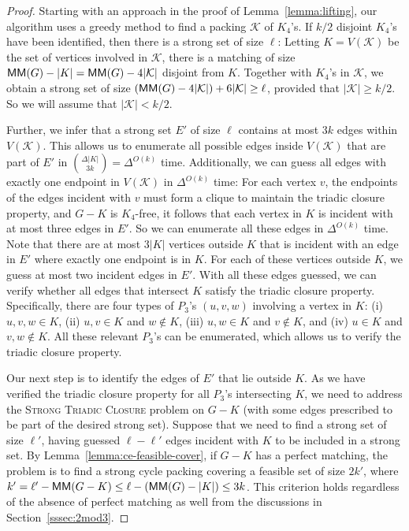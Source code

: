 \begin{proof}
  Starting with an approach in the proof of Lemma~\ref{lemma:lifting},
  our algorithm uses a greedy method to find a packing $\mathcal{K}$ of $K_4$'s.
  If $k/2$ disjoint $K_4$'s have been identified, then there is a strong set of size $\ell$: 
  Letting $K = V(\mathcal{K})$ be the set of vertices involved in $\mathcal{K}$,
  there is a matching of size $\mathsf{MM}(G) - |K| = \mathsf{MM}(G) - 4|\mathcal{K}|$ disjoint from $K$.
  Together with $K_4$'s in $\mathcal{K}$, we obtain a strong set of size $(\mathsf{MM}(G) - 4|\mathcal{K}|) + 6|\mathcal{K}| \ge \ell$, provided that $|\mathcal{K}| \ge k/2$. 
  So we will assume that $|\mathcal{K}| < k/2$.

  Further, we infer that a strong set $E'$ of size $\ell$ contains at most $3k$ edges within $V(\mathcal{K})$.
  This allows us to enumerate all possible edges inside $V(\mathcal{K})$ that are part of $E'$ in $\binom{\Delta |K|}{3k} = \Delta^{O(k)}$ time.
  Additionally, we can guess all edges with exactly one endpoint in $V(\mathcal{K})$ in $\Delta^{O(k)}$ time:
  For each vertex $v$, the endpoints of the edges incident with $v$ must form a clique to maintain the triadic closure property, and $G - K$ is $K_4$-free, it follows that each vertex in $K$ is incident with at most three edges in $E'$.
  So we can enumerate all these edges in $\Delta^{O(k)}$ time.
  Note that there are at most $3|K|$ vertices outside $K$ that is incident with an edge in $E'$ where exactly one endpoint is in $K$.
  For each of these vertices outside $K$, we guess at most two incident edges in $E'$.
  With all these edges guessed, we can verify whether all edges that intersect $K$ satisfy the triadic closure property.
  Specifically, there are four types of $P_3$'s $(u, v, w)$ involving a vertex in $K$:
  (i) $u, v, w \in K$, (ii) $u, v \in K$ and $w \notin K$, (iii) $u, w \in K$ and $v \notin K$, and (iv) $u \in K$ and $v, w \notin K$.
  All these relevant $P_3$'s can be enumerated, which allows us to verify the triadic closure property.

  Our next step is to identify the edges of $E'$ that lie outside $K$.
  As we have verified the triadic closure property for all $P_3$'s intersecting $K$, we need to address the \textsc{Strong Triadic Closure} problem on $G - K$ (with some edges prescribed to be part of the desired strong set).
  Suppose that we need to find a strong set of size $\ell'$, having guessed $\ell - \ell'$ edges incident with $K$ to be included in a strong set.
  By Lemma~\ref{lemma:ce-feasible-cover}, if $G - K$ has a perfect matching, the problem is to find a strong cycle packing covering a feasible set of size $2k'$, where $k' = \ell' - \mathsf{MM}(G - K) \le \ell - (\mathsf{MM}(G) - |K|) \le 3k$.
  This criterion holds regardless of the absence of perfect matching as well from the discussions in Section~\ref{sssec:2mod3}.


\end{proof}
